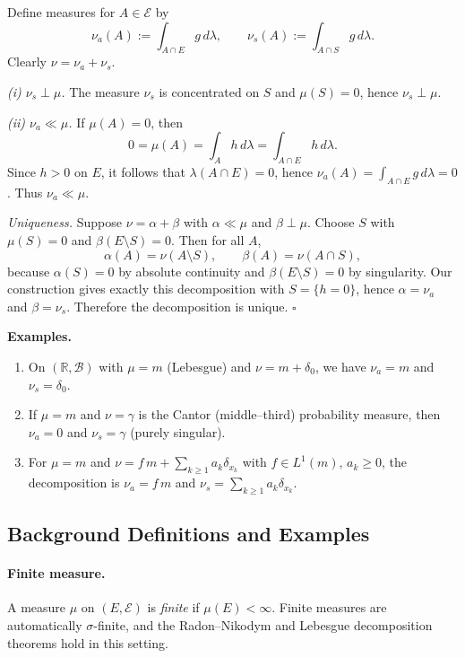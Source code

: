 \documentclass[12pt,a4paper]{article}
\newcommand{\qed}{\hfill$\square$}
\theoremstyle{plain}
\theoremstyle{definition}
\theoremstyle{remark}
\theoremstyle{remark}
\theoremstyle{definition}
\begin{document}
	Define measures for $A\in\mathcal E$ by
	\[
	\nu_a(A):=\int_{A\cap E} g\,d\lambda,\qquad
	\nu_s(A):=\int_{A\cap S} g\,d\lambda.
	\]
	Clearly $\nu=\nu_a+\nu_s$.
	
	\medskip
	\emph{(i) $\nu_s\perp\mu$.}
	The measure $\nu_s$ is concentrated on $S$ and $\mu(S)=0$, hence $\nu_s\perp\mu$.
	
	\medskip
	\emph{(ii) $\nu_a\ll\mu$.}
	If $\mu(A)=0$, then
	\[
	0=\mu(A)=\int_A h\,d\lambda=\int_{A\cap E} h\,d\lambda.
	\]
	Since $h>0$ on $E$, it follows that $\lambda(A\cap E)=0$, hence
	$\nu_a(A)=\int_{A\cap E} g\,d\lambda=0$. Thus $\nu_a\ll\mu$.
	
	\medskip
	\emph{Uniqueness.}
	Suppose $\nu=\alpha+\beta$ with $\alpha\ll\mu$ and $\beta\perp\mu$.
	Choose $S$ with $\mu(S)=0$ and $\beta(E\setminus S)=0$.
	Then for all $A$,
	\[
	\alpha(A)=\nu(A\setminus S),\qquad \beta(A)=\nu(A\cap S),
	\]
	because $\alpha(S)=0$ by absolute continuity and $\beta(E\setminus S)=0$ by singularity.
	Our construction gives exactly this decomposition with $S=\{h=0\}$,
	hence $\alpha=\nu_a$ and $\beta=\nu_s$. Therefore the decomposition is unique.
	\qed
	
	\bigskip
	
	\textbf{Examples.}
	\begin{enumerate}
		\item On $(\mathbb{R},\mathcal B)$ with $\mu=m$ (Lebesgue) and $\nu=m+\delta_0$, we have
		$\nu_a=m$ and $\nu_s=\delta_0$.
		\item If $\mu=m$ and $\nu=\gamma$ is the Cantor (middle–third) probability measure, then
		$\nu_a=0$ and $\nu_s=\gamma$ (purely singular).
		\item For $\mu=m$ and $\nu=f\,m+\sum_{k\ge1} a_k\delta_{x_k}$ with $f\in L^1(m)$, $a_k\ge0$,
		the decomposition is $\nu_a=f\,m$ and $\nu_s=\sum_{k\ge1} a_k\delta_{x_k}$.
	\end{enumerate}
	
	\subsection*{Background Definitions and Examples}
	
	\paragraph{Finite measure.}
	A measure $\mu$ on $(E,\mathcal E)$ is \emph{finite} if $\mu(E)<\infty$.
	Finite measures are automatically $\sigma$-finite, and the Radon--Nikodym and
	Lebesgue decomposition theorems hold in this setting.
	
\end{document}
